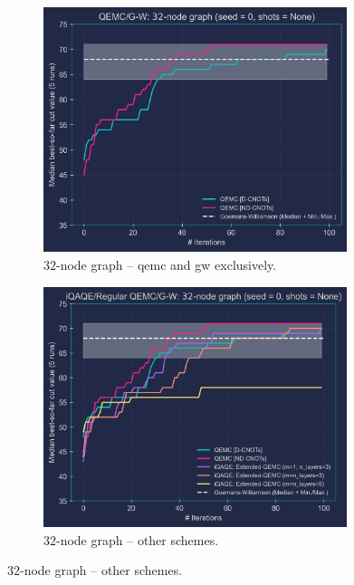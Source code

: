 \begin{figure}[hb!]
    \centering
    \begin{subfigure}[t]{0.495\textwidth}
		\includegraphics[width=0.975\textwidth, height=0.75\textwidth]{Figures/Appendix_A/32-node/32-node_Graph(QEMC&G-W)_Updated.png}
		\caption{$32$-node graph – \acrshort{qemc} and \acrshort{gw} exclusively.}
		\label{fig:C_BSF_1_32-node}
	\end{subfigure}
    \hfill
    \begin{subfigure}[t]{0.495\textwidth}
		\includegraphics[width=0.975\textwidth, height=0.75\textwidth]{Figures/Appendix_A/32-node/32-node_Graph_Updated.png}
		\caption{$32$-node graph – other schemes.}
		\label{fig:C_BSF_2_32-node}
	\end{subfigure}


\end{figure}
